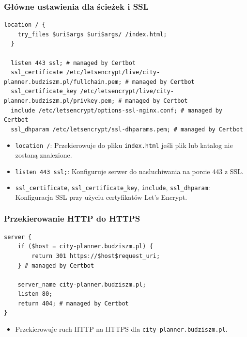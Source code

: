 \subsubsection{Główne ustawienia dla ścieżek i SSL}
\begin{lstlisting}[label={lst:n7}]
  location / {
    try_files $uri$args $uri$args/ /index.html;
  }

  listen 443 ssl; # managed by Certbot
  ssl_certificate /etc/letsencrypt/live/city-planner.budziszm.pl/fullchain.pem; # managed by Certbot
  ssl_certificate_key /etc/letsencrypt/live/city-planner.budziszm.pl/privkey.pem; # managed by Certbot
  include /etc/letsencrypt/options-ssl-nginx.conf; # managed by Certbot
  ssl_dhparam /etc/letsencrypt/ssl-dhparams.pem; # managed by Certbot
\end{lstlisting}
\begin{itemize}
    \item \texttt{location /}: Przekierowuje do pliku \texttt{index.html} jeśli plik lub katalog nie zostaną znalezione.
    \item \texttt{listen 443 ssl;}: Konfiguruje serwer do nasłuchiwania na porcie 443 z SSL\@.
    \item \texttt{ssl\_certificate}, \texttt{ssl\_certificate\_key}, \texttt{include}, \texttt{ssl\_dhparam}: Konfiguracja SSL przy użyciu certyfikatów Let's Encrypt.
\end{itemize}

\subsubsection{Przekierowanie HTTP do HTTPS}
\begin{lstlisting}[label={lst:n8}]
server {
    if ($host = city-planner.budziszm.pl) {
        return 301 https://$host$request_uri;
    } # managed by Certbot

    server_name city-planner.budziszm.pl;
    listen 80;
    return 404; # managed by Certbot
}
\end{lstlisting}
\begin{itemize}
    \item Przekierowuje ruch HTTP na HTTPS dla \texttt{city-planner.budziszm.pl}.
\end{itemize}

